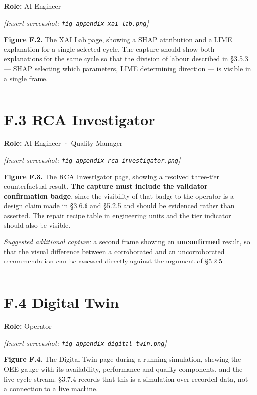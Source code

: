 \textbf{Role:} AI Engineer

\emph{{[}Insert screenshot: \texttt{fig\_appendix\_xai\_lab.png}{]}}

\textbf{Figure F.2.} The XAI Lab page, showing a SHAP attribution and a LIME explanation for a single selected cycle. The capture should show both explanations for the same cycle so that the division of labour described in §3.5.3 --- SHAP selecting which parameters, LIME determining direction --- is visible in a single frame.

\begin{center}\rule{0.5\linewidth}{0.5pt}\end{center}

\hypertarget{f.3-rca-investigator}{%
\section{F.3 RCA Investigator}\label{f.3-rca-investigator}}

\textbf{Role:} AI Engineer · Quality Manager

\emph{{[}Insert screenshot: \texttt{fig\_appendix\_rca\_investigator.png}{]}}

\textbf{Figure F.3.} The RCA Investigator page, showing a resolved three-tier counterfactual result. \textbf{The capture must include the validator confirmation badge}, since the visibility of that badge to the operator is a design claim made in §3.6.6 and §5.2.5 and should be evidenced rather than asserted. The repair recipe table in engineering units and the tier indicator should also be visible.

\emph{Suggested additional capture:} a second frame showing an \textbf{unconfirmed} result, so that the visual difference between a corroborated and an uncorroborated recommendation can be assessed directly against the argument of §5.2.5.

\begin{center}\rule{0.5\linewidth}{0.5pt}\end{center}

\hypertarget{f.4-digital-twin}{%
\section{F.4 Digital Twin}\label{f.4-digital-twin}}

\textbf{Role:} Operator

\emph{{[}Insert screenshot: \texttt{fig\_appendix\_digital\_twin.png}{]}}

\textbf{Figure F.4.} The Digital Twin page during a running simulation, showing the OEE gauge with its availability, performance and quality components, and the live cycle stream. §3.7.4 records that this is a simulation over recorded data, not a connection to a live machine.


